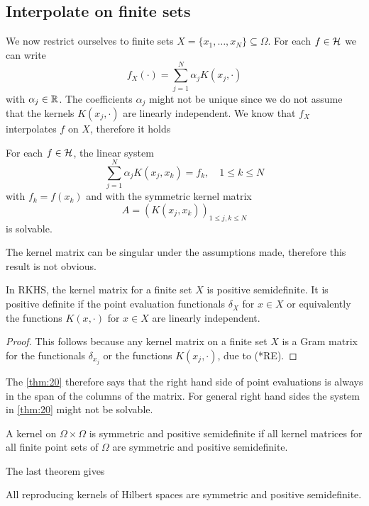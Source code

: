 \documentclass[../skript.tex]{subfiles}
\begin{document}
\subsection*{Interpolate on finite sets}
We now restrict ourselves to finite sets $X = \{ x_1, \ldots, x_N \} \subseteq \Omega$. For each $f \in \mathcal{H}$ we can write
\[
	f_X(\cdot) = \sum_{j=1}^N \alpha_j K(x_j, \cdot)
\]
with $\alpha_j \in \mathbb{R}$.
The coefficients $\alpha_j$ might not be unique since we do not assume that the kernels $K(x_j, \cdot)$ are linearly independent.
We know that $f_X$ interpolates $f$ on $X$, therefore it holds
\addtocounter{equation}{2} %
\begin{theorem} %
\label{thm:20}
For each $f \in \mathcal{H}$, the linear system
\[
	\sum_{j=1}^N \alpha_j K(x_j, x_k) = f_k, \quad 1 \leq k \leq N
\]
with $f_k = f(x_k)$ and with the symmetric kernel matrix
\[
	A = (K(x_j, x_k))_{1 \leq j, k \leq N}
\]
is solvable.
\end{theorem}
\begin{remark}
The kernel matrix can be singular under the assumptions made, therefore this result is not obvious.
\end{remark}
\begin{theorem} %
\label{thm:21}
In RKHS, the kernel matrix for a finite set $X$ is positive semidefinite. It is positive definite if the point evaluation functionals $\delta_X$ for $x \in X$ or equivalently the functions $K(x, \cdot)$ for $x \in X$ are linearly independent.
\end{theorem}
\begin{proof}
This follows because any kernel matrix on a finite set $X$ is a Gram matrix for the functionals $\delta_{x_j}$ or the functions $K(x_j, \cdot)$, due to (*RE). %
\end{proof}
\begin{remark}
The \cref{thm:20} therefore says that the right hand side of point evaluations is always in the span of the columns of the matrix.
For general right hand sides the system in \cref{thm:20} might not be solvable.
\end{remark}
\begin{definition} %
\label{thm:22}
A kernel on $\Omega \times \Omega$ is symmetric and positive semidefinite if all kernel matrices for all finite point sets of $\Omega$ are symmetric and positive semidefinite.
\end{definition}
The last theorem gives
\begin{theorem} %
\label{thm:23}
All reproducing kernels of Hilbert spaces are symmetric and positive semidefinite.
\end{theorem}
\end{document}
